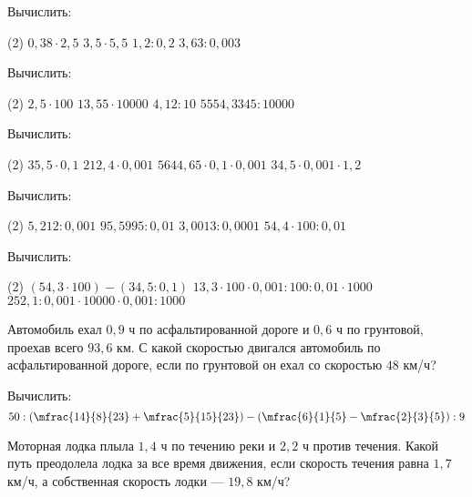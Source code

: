 %
%

\begin{class}[number=1]
	\begin{listofex}
		\item Вычислить:
		\begin{tasks}(2)
			\task \( 0,38\cdot2,5 \)
			\task \( 3,5\cdot5,5 \)
			\task \( 1,2:0,2 \)
			\task \( 3,63:0,003 \)
		\end{tasks}
		\item Вычислить:
		\begin{tasks}(2)
			\task \( 2,5\cdot100 \)
			\task \( 13,55\cdot10000 \)
			\task \( 4,12:10 \)
			\task \( 5554,3345:10000 \)
		\end{tasks}
		\item Вычислить:
		\begin{tasks}(2)
			\task \( 35,5\cdot0,1 \)
			\task \( 212,4\cdot0,001 \)
			\task \( 5644,65\cdot0,1\cdot0,001 \)
			\task \( 34,5\cdot0,001\cdot1,2 \)
		\end{tasks}
		\item Вычислить:
		\begin{tasks}(2)
			\task \( 5,212:0,001 \)
			\task \( 95,5995:0,01 \)
			\task \( 3,0013:0,0001 \)
			\task \( 54,4\cdot100:0,01 \)
		\end{tasks}
		\item Вычислить:
		\begin{tasks}(2)
			\task \( (54,3\cdot100)-(34,5:0,1) \)
			\task \( 13,3\cdot100\cdot0,001:100:0,01\cdot1000 \)
			\task \( 252,1:0,001\cdot10000\cdot0,001:1000 \)
		\end{tasks}
		\item Автомобиль ехал \( 0,9 \) ч по асфальтированной дороге и \( 0,6 \) ч по грунтовой, проехав всего \( 93,6 \) км.
		С какой скоростью двигался автомобиль по асфальтированной дороге,
		если по грунтовой он ехал со скоростью \( 48 \) км/ч?
		\item Вычислить:
		\[ 50:\left( \mfrac{14}{8}{23}+\mfrac{5}{15}{23} \right)-\left( \mfrac{6}{1}{5}-\mfrac{2}{3}{5} \right):9 \]
		\item Моторная лодка плыла \( 1,4 \) ч по течению реки и \( 2,2 \) ч против течения.
		Какой путь преодолела лодка за все время движения, если скорость
		течения равна \( 1,7 \) км/ч, а собственная скорость лодки --- \( 19,8 \) км/ч?
	\end{listofex}
\end{class}

